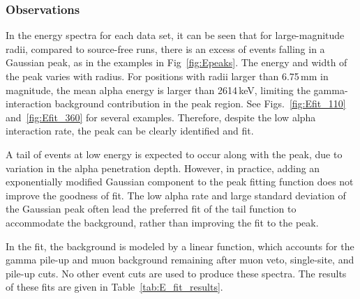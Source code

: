 \documentclass[groupedaddress,rmp,amsmath,amssymb,bibnotes,altaffilletter,twocolumn]{revtex4-1}
\begin{document}
\subsubsection{Observations}\label{ssec:E_obs}
In the energy spectra for each data set, it can be seen that for large-magnitude radii, compared to source-free runs, there is an excess of events falling in a Gaussian peak, as in the examples in Fig~\ref{fig:Epeaks}. The energy and width of the peak varies with radius. For positions with radii larger than 6.75\,mm in magnitude, the mean alpha energy is larger than 2614\,keV, limiting the gamma-interaction background contribution in the peak region. See Figs.~\ref{fig:Efit_110} and~\ref{fig:Efit_360} for several examples. Therefore, despite the low alpha interaction rate, the peak can be clearly identified and fit.

A tail of events at low energy is expected to occur along with the peak, due to variation in the alpha penetration depth. However, in practice, adding an exponentially modified Gaussian component to the peak fitting function does not improve the goodness of fit. The low alpha rate and large standard deviation of the Gaussian peak often lead the preferred fit of the tail function to accommodate the background, rather than improving the fit to the peak. 

In the fit, the background is modeled by a linear function, which accounts for the gamma pile-up and muon background remaining after muon veto, single-site, and pile-up cuts. No other event cuts are used to produce these spectra. The results of these fits are given in Table~\ref{tab:E_fit_results}.
\end{document}
